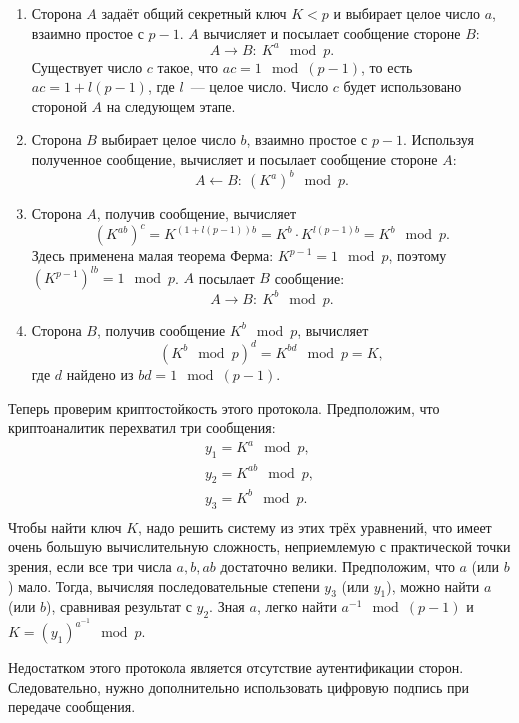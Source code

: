 \begin{enumerate}
    \item Сторона $A$ задаёт общий секретный ключ $K <p$ и выбирает целое число $a$, взаимно простое с $p-1$. $A$ вычисляет и посылает сообщение стороне $B$:
            \[ A \rightarrow B: ~ K^a \mod p. \]
        Существует число $c$ такое, что $a c = 1 \mod (p-1)$, то есть $a c = 1 + l (p-1)$, где $l$~--- целое число. Число $c$ будет использовано стороной $A$ на следующем этапе.
    \item Сторона $B$ выбирает целое число $b$, взаимно простое с $p-1$. Используя полученное сообщение, вычисляет и посылает сообщение стороне $A$:
            \[ A \leftarrow B: ~ (K^a)^b \mod p. \]
    \item Сторона $A$, получив сообщение, вычисляет
        \[ \left( K^{ab} \right)^c = K^{(1 + l (p-1)) b} = K^b \cdot K^{l (p-1) b} = K^b \mod p. \]
        Здесь применена малая теорема Ферма: $K^{p-1} = 1 \mod p$, поэтому $\left( K^{p-1} \right)^{lb} = 1 \mod p$.
        $A$ посылает $B$ сообщение:
            \[ A \rightarrow B: ~ K^b \mod p. \]
    \item Сторона $B$, получив сообщение $K^{b}\mod p$, вычисляет
        \[ (K^b \mod p)^d = K^{bd} \mod p = K, \]
        где $d$ найдено из $b d =1 \mod (p-1)$.
\end{enumerate}

Теперь проверим криптостойкость этого протокола. Предположим, что криптоаналитик перехватил три сообщения:
\[ \begin{array}{l}
    y_1 = K^a \mod p, \\
    y_2 = K^{ab} \mod p, \\
    y_3 = K^b \mod p. \\
\end{array} \]
Чтобы найти ключ $K$, надо решить систему из этих трёх уравнений, что имеет очень большую вычислительную сложность, неприемлемую с практической точки зрения, если все три числа $a, b, ab$ достаточно велики. Предположим, что $a$ (или $b$) мало. Тогда, вычисляя последовательные степени $y_3$ (или $y_1$), можно найти $a$ (или $b$), сравнивая результат с $y_2$. Зная $a$, легко найти $a^{-1}\mod(p-1)$ и $K=(y_1)^{a^{-1}}\mod p$.

Недостатком этого протокола является отсутствие аутентификации сторон. Следовательно, нужно дополнительно использовать цифровую подпись при передаче сообщения.
